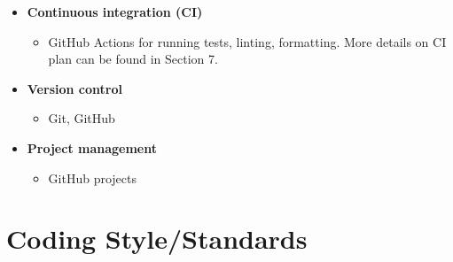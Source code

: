 \documentclass{article}
\begin{document}
\begin{itemize}
    \item \textbf{Continuous integration (CI)}
    \begin{itemize}
        \item GitHub Actions for running tests, linting, formatting. More
        details on CI plan can be found in Section 7.
    \end{itemize}
    
    \item \textbf{Version control}
    \begin{itemize}
        \item Git, GitHub
    \end{itemize}
    
    \item \textbf{Project management}
    \begin{itemize}
        \item GitHub projects
    \end{itemize}
\end{itemize}

\section{Coding Style/Standards}
\end{document}
